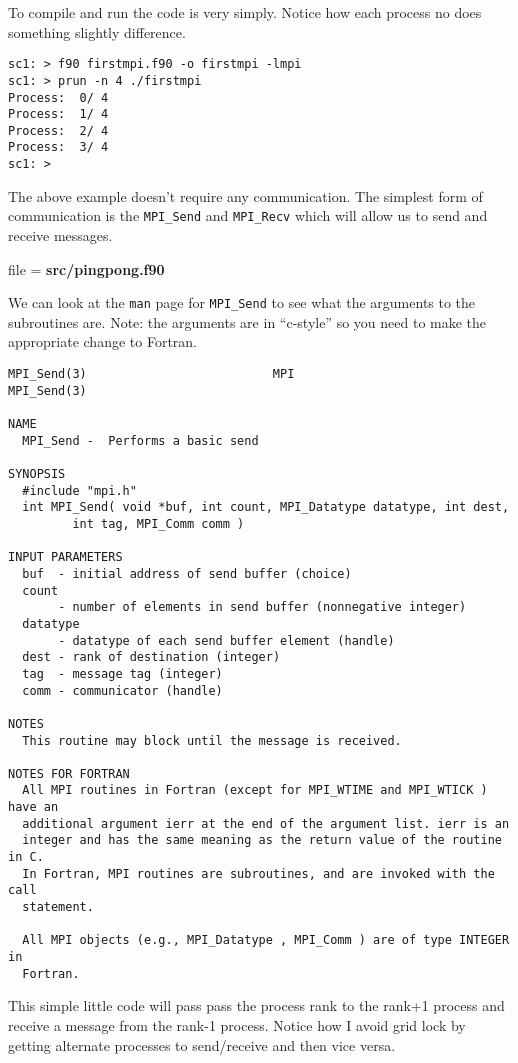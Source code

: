 \documentclass[12pt,a4paper,oneside,openany]{report}
\newcommand{\fcode}[1]{\par \small file = \textbf{#1}  \normalsize}
\newcommand{\code}[1]{\texttt{#1}}
\begin{document}
\newpage

To compile and run the code is very simply.  Notice how each process no does something slightly difference.

\small
\begin{verbatim}
sc1: > f90 firstmpi.f90 -o firstmpi -lmpi
sc1: > prun -n 4 ./firstmpi
Process:  0/ 4
Process:  1/ 4
Process:  2/ 4
Process:  3/ 4
sc1: > 
\end{verbatim}
\normalsize

The above example doesn't require any communication.  The simplest form of communication is the \code{MPI\_Send} and \code{MPI\_Recv} which will allow us to send and receive messages.

\fcode{src/pingpong.f90}

We can look at the \code{man} page for \code{MPI\_Send} to see what the arguments to the subroutines are.  Note: the arguments are in ``c-style'' so you need to make the appropriate change to Fortran.

\small
\begin{verbatim}
MPI_Send(3)                          MPI                          MPI_Send(3)

NAME
  MPI_Send -  Performs a basic send

SYNOPSIS
  #include "mpi.h"
  int MPI_Send( void *buf, int count, MPI_Datatype datatype, int dest,
         int tag, MPI_Comm comm )

INPUT PARAMETERS
  buf  - initial address of send buffer (choice)
  count
       - number of elements in send buffer (nonnegative integer)
  datatype
       - datatype of each send buffer element (handle)
  dest - rank of destination (integer)
  tag  - message tag (integer)
  comm - communicator (handle)

NOTES
  This routine may block until the message is received.

NOTES FOR FORTRAN
  All MPI routines in Fortran (except for MPI_WTIME and MPI_WTICK ) have an
  additional argument ierr at the end of the argument list. ierr is an
  integer and has the same meaning as the return value of the routine in C.
  In Fortran, MPI routines are subroutines, and are invoked with the call
  statement.

  All MPI objects (e.g., MPI_Datatype , MPI_Comm ) are of type INTEGER in
  Fortran.
\end{verbatim}
\normalsize

\newpage

This simple little code will pass pass the process rank to the rank+1 process and receive a message from the rank-1 process.  Notice how I avoid grid lock by getting alternate processes to send/receive and then vice versa.
\end{document}
